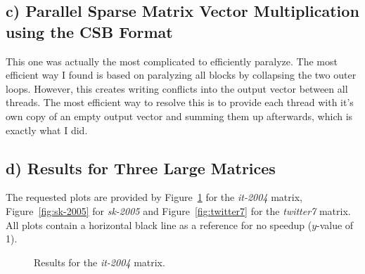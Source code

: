 \documentclass[a4paper, 11pt]{article}
\begin{document}
\subsection*{c) Parallel Sparse Matrix Vector Multiplication using the CSB Format}
This one was actually the most complicated to efficiently paralyze. The most
efficient way I found is based on paralyzing all blocks by collapsing the two
outer loops. However, this creates writing conflicts into the output vector
between all threads. The most efficient way to resolve this is to provide each
thread with it's own copy of an empty output vector and summing them up
afterwards, which is exactly what I did.

\subsection*{d) Results for Three Large Matrices}
The requested plots are provided by Figure~\ref{fig:it-2004} for the
\textit{it-2004} matrix, Figure~\ref{fig:sk-2005} for \textit{sk-2005} and
Figure~\ref{fig:twitter7} for the \textit{twitter7} matrix. All plots contain a
horizontal black line as a reference for no speedup ($y$-value of 1).
\begin{figure}
  \centering
  \caption{Results for the \textit{it-2004} matrix.}
  \label{fig:it-2004}
\end{figure}
\end{document}
